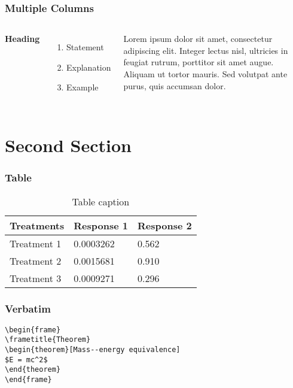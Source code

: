\documentclass[usenames,dvipsnames]{beamer}
\begin{document}
\begin{frame}
\frametitle{Multiple Columns}
\begin{columns}[c] %

\textbf{Heading}
\begin{enumerate}
\item Statement
\item Explanation
\item Example
\end{enumerate}

Lorem ipsum dolor sit amet, consectetur adipiscing elit. Integer lectus nisl, ultricies in feugiat rutrum, porttitor sit amet augue. Aliquam ut tortor mauris. Sed volutpat ante purus, quis accumsan dolor.

\end{columns}
\end{frame}



\section{Second Section}

\begin{frame}
\frametitle{Table}
\begin{table}
\begin{tabular}{l l l}
\toprule
\textbf{Treatments} & \textbf{Response 1} & \textbf{Response 2}\\
\midrule
Treatment 1 & 0.0003262 & 0.562 \\
Treatment 2 & 0.0015681 & 0.910 \\
Treatment 3 & 0.0009271 & 0.296 \\
\bottomrule
\end{tabular}
\caption{Table caption}
\end{table}
\end{frame}



\begin{frame}[fragile] %
\frametitle{Verbatim}
\begin{example}
\begin{verbatim}
\begin{frame}
\frametitle{Theorem}
\begin{theorem}[Mass--energy equivalence]
$E = mc^2$
\end{theorem}
\end{frame}\end{verbatim}
\end{example}
\end{frame}
\end{document}
